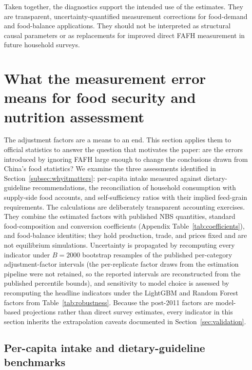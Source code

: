 \documentclass[preprint,12pt,authoryear]{elsarticle}
\begin{document}
Taken together, the diagnostics support the intended use of the estimates. They are transparent, uncertainty-quantified measurement corrections for food-demand and food-balance applications. They should not be interpreted as structural causal parameters or as replacements for improved direct FAFH measurement in future household surveys.

\section{What the measurement error means for food security and nutrition assessment}
\label{sec:applications}

The adjustment factors are a means to an end. This section applies them to official statistics to answer the question that motivates the paper: are the errors introduced by ignoring FAFH large enough to change the conclusions drawn from China's food statistics? We examine the three assessments identified in Section~\ref{subsec:whyitmatters}: per-capita intake measured against dietary-guideline recommendations, the reconciliation of household consumption with supply-side food accounts, and self-sufficiency ratios with their implied feed-grain requirements. The calculations are deliberately transparent accounting exercises. They combine the estimated factors with published NBS quantities, standard food-composition and conversion coefficients (Appendix Table~\ref{tab:coefficients}), and food-balance identities; they hold production, trade, and prices fixed and are not equilibrium simulations. Uncertainty is propagated by recomputing every indicator under $B=2000$ bootstrap resamples of the published per-category adjustment-factor intervals (the per-replicate factor draws from the estimation pipeline were not retained, so the reported intervals are reconstructed from the published percentile bounds), and sensitivity to model choice is assessed by recomputing the headline indicators under the LightGBM and Random Forest factors from Table~\ref{tab:robustness}. Because the post-2011 factors are model-based projections rather than direct survey estimates, every indicator in this section inherits the extrapolation caveats documented in Section~\ref{sec:validation}.

\subsection{Per-capita intake and dietary-guideline benchmarks}
\label{subsec:app_nutrition}
\end{document}
